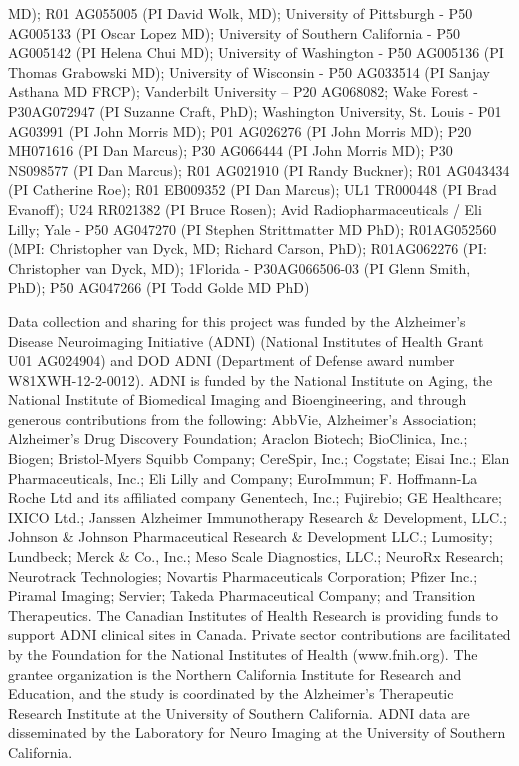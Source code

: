 \documentclass[pdflatex,sn-nature]{sn-jnl}%
\theoremstyle{thmstyleone}%
\theoremstyle{thmstyletwo}%
\theoremstyle{thmstylethree}%
\begin{document}
\begin{appendices}
MD); R01 AG055005 (PI David Wolk, MD); University of Pittsburgh - P50 AG005133 (PI Oscar Lopez MD); University of Southern California - P50 AG005142 (PI Helena Chui MD); University of Washington - P50 AG005136 (PI Thomas Grabowski MD); University of Wisconsin - P50 AG033514 (PI Sanjay Asthana MD FRCP); Vanderbilt University – P20 AG068082; Wake Forest - P30AG072947 (PI Suzanne Craft, PhD); Washington University, St. Louis - P01 AG03991 (PI John Morris MD); P01 AG026276 (PI John Morris MD); P20 MH071616 (PI Dan Marcus); P30 AG066444 (PI John Morris MD); P30 NS098577 (PI Dan Marcus); R01 AG021910 (PI Randy Buckner); R01 AG043434 (PI Catherine Roe); R01 EB009352 (PI Dan Marcus); UL1 TR000448 (PI Brad Evanoff); U24 RR021382 (PI Bruce Rosen); Avid Radiopharmaceuticals / Eli Lilly; Yale - P50 AG047270 (PI Stephen Strittmatter MD PhD); R01AG052560 (MPI: Christopher van Dyck, MD; Richard Carson, PhD); R01AG062276 (PI: Christopher van Dyck, MD); 1Florida - P30AG066506-03 (PI Glenn Smith, PhD); P50 AG047266 (PI Todd Golde MD PhD)


Data collection and sharing for this project was funded by the Alzheimer's Disease Neuroimaging Initiative (ADNI) (National Institutes of Health Grant U01 AG024904) and DOD ADNI (Department of Defense award number W81XWH-12-2-0012). ADNI is funded by the National Institute on Aging, the National Institute of Biomedical Imaging and Bioengineering, and through generous contributions from the following: AbbVie, Alzheimer’s Association; Alzheimer’s Drug Discovery Foundation; Araclon Biotech; BioClinica, Inc.; Biogen; Bristol-Myers Squibb Company; CereSpir, Inc.; Cogstate; Eisai Inc.; Elan Pharmaceuticals, Inc.; Eli Lilly and Company; EuroImmun; F. Hoffmann-La Roche Ltd and its affiliated company Genentech, Inc.; Fujirebio; GE Healthcare; IXICO Ltd.; Janssen Alzheimer Immunotherapy Research \& Development, LLC.; Johnson \& Johnson Pharmaceutical Research \& Development LLC.; Lumosity; Lundbeck; Merck \& Co., Inc.; Meso Scale Diagnostics, LLC.;  NeuroRx Research; Neurotrack Technologies; Novartis Pharmaceuticals Corporation; Pfizer Inc.; Piramal Imaging; Servier; Takeda Pharmaceutical Company; and Transition Therapeutics. The Canadian Institutes of Health Research is providing funds to support ADNI clinical sites in Canada. Private sector contributions are facilitated by the Foundation for the National Institutes of Health (www.fnih.org). The grantee organization is the Northern California Institute for Research and Education, and the study is coordinated by the Alzheimer’s Therapeutic Research Institute at the University of Southern California. ADNI data are disseminated by the Laboratory for Neuro Imaging at the University of Southern California.  



\end{appendices}
\end{document}

